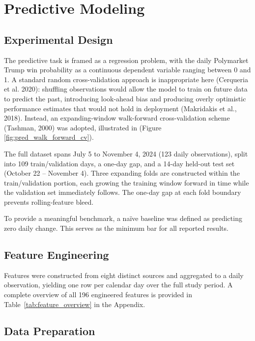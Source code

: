 \section{Predictive Modeling}

\subsection{Experimental Design}

The predictive task is framed as a regression problem, with the daily Polymarket Trump win probability as a continuous dependent variable ranging between 0 and 1. A standard random cross-validation approach is inappropriate here (Cerqueria et al. 2020): shuffling observations would allow the model to train on future data to predict the past, introducing look-ahead bias and producing overly optimistic performance estimates that would not hold in deployment (Makridakis et al., 2018). Instead, an expanding-window walk-forward cross-validation scheme (Tashman, 2000) was adopted, illustrated in (Figure \ref{fig:pred_walk_forward_cv}).

The full dataset spans July 5 to November 4, 2024 (123 daily observations), split into 109 train/validation days, a one-day gap, and a 14-day held-out test set (October 22 -- November 4). Three expanding folds are constructed within the train/validation portion, each growing the training window forward in time while the validation set immediately follows. The one-day gap at each fold boundary prevents rolling-feature bleed.

To provide a meaningful benchmark, a naïve baseline was defined as predicting zero daily change. This serves as the minimum bar for all reported results.

\subsection{Feature Engineering}

Features were constructed from eight distinct sources and aggregated to a daily observation, yielding one row per calendar day over the full study period. A complete overview of all 196 engineered features is provided in Table~\ref{tab:feature_overview} in the Appendix.

\subsection{Data Preparation}

